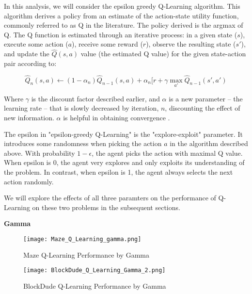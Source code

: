 \documentclass{article}
\begin{document}
In this analysis, we will consider the epsilon greedy Q-Learning algorithm. This algorithm derives a policy from an estimate
of the action-state utility function, commonly referred to as Q in the literature. The policy derived is the argmax of Q. The Q
function is estimated through an iterative process: in a given state ($s$), execute some action ($a$), receive some reward ($r$),
observe the resulting state ($s'$), and update the $\hat{Q}(s,a)$ value (the estimated Q value) for the given state-action pair
according to:

\begin{equation*}
    \hat{Q}_{n}(s,a) \leftarrow (1 - \alpha_{n})\hat{Q}_{n-1}(s,a) + \alpha_{n}[r + \gamma\max_{a'} \hat{Q}_{n-1}(s', a')
\end{equation*}

Where $\gamma$ is the discount factor described earlier, and $\alpha$ is a new parameter -- the learning rate -- that is slowly
decreased by iteration, $n$, discounting the effect of new information. $\alpha$ is helpful in obtaining convergence
\cite{ml_textbook}.

The epsilon in "epsilon-greedy Q-Learning" is the "explore-exploit" parameter. It introduces some randomness when picking the
action $a$ in the algorithm described above. With probability $1 - \epsilon$, the agent picks the action with maximal Q value.
When epsilon is 0, the agent very explores and only exploits its understanding of the problem. In contrast, when epsilon is 1,
the agent always selects the next action randomly.

We will explore the effects of all three paramters on the performance of Q-Learning on these two problems in the subsequent
sections.

\textbf{Gamma}



\begin{figure}
    \centering
    \begin{minipage}{0.5\textwidth}
        \centering
        \texttt{[image: Maze\_Q\_Learning\_gamma.png]}
        \caption{Maze Q-Learning Performance by Gamma}
        \label{fig:maze-ql-gamma}
    \end{minipage}\hfill
    \begin{minipage}{0.5\textwidth}
        \centering
        \texttt{[image: BlockDude\_Q\_Learning\_Gamma\_2.png]}
        \caption{BlockDude Q-Learning Performance by Gamma}
        \label{fig:bd-ql-gamma}
    \end{minipage}
\end{figure}
\end{document}
